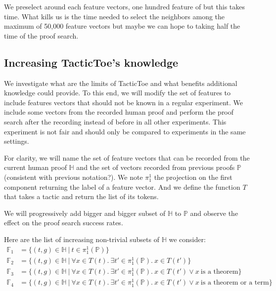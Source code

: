 \documentclass[runningheads,a4paper,draft]{svjour3}
\def\tactictoe{\textsf{TacticToe}\xspace}
\begin{document}
We preselect around each feature vectors, one hundred feature of but this takes 
time. What kills us is the time needed to select the neighbors among the 
maximum of 50,000 feature vectors but maybe we can hope to 
taking half the time of the proof search.


\subsection{Increasing \tactictoe's knowledge}\label{sec:perfect_exp}

We investigate what are the limits of \tactictoe and what benefits additional 
knowledge could provide. To this end, we will modify the set of features to 
include features vectors that should not be known in a regular experiment. We  
include some vectors from the recorded human proof and perform the proof search 
after the recording instead of before in all other experiments. This experiment 
is not fair and should only be compared to 
experiments in the same settings.

For clarity, we will name the set of feature vectors that can be recorded from 
the current human proof $\mathbb{H}$ and the set of vectors recorded from 
previous proofs $\mathbb{P}$ (consistent with previous notation?). We note 
$\pi_1^1$ the projection on the 
first component returning the label of a feature vector. And we define the 
function $T$ that takes a tactic and return the list of its tokens.

We will progressively add bigger and bigger 
subset of $\mathbb{H}$ to $\mathbb{P}$ and observe the effect on the proof 
search success rates. 

Here are the list of increasing non-trivial subsets of $\mathbb{H}$ we consider:
\begin{align*}
\mathbb{F}_1 &= \lbrace (t,g) \in \mathbb{H}\ |\ t \in \pi_1^1(\mathbb{P})  
   \rbrace \\
\mathbb{F}_2 &= \lbrace (t,g) \in \mathbb{H}\ |\ \forall x \in T(t).\ \exists 
t'\in \pi_1^1(\mathbb{P}).\ x \in T(t') \rbrace\\
\mathbb{F}_3 &= \lbrace (t,g) \in \mathbb{H}\ |\ \forall x \in T(t).\ \exists 
t'\in \pi_1^1(\mathbb{P}).\ x \in T(t') \vee x\ \mbox{is a theorem} \rbrace\\
\mathbb{F}_4 &= \lbrace (t,g) \in \mathbb{H}\ |\ \forall x \in T(t).\ \exists 
t'\in \pi_1^1(\mathbb{P}).\ x \in T(t') \vee x\ \mbox{is a theorem or a term} 
\rbrace\\
\end{align*}
\end{document}
